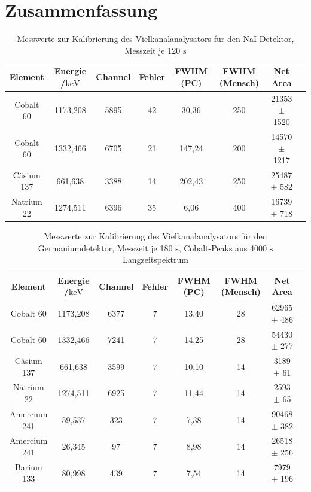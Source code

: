 \documentclass[
	parskip=half,10pt,
	numbers= noenddot, %
	toc=flat, %
	oneside,
	twocolumn,
	]{scrartcl}
\begin{document}
\section{Zusammenfassung}

\newpage



\FloatBarrier
\begin{appendix}

\begin{table}[h]
 \begin{tabular}{cccccccc}
Element & Energie /$\si{\kilo \electronvolt}$& Channel & Fehler & FWHM (PC) & FWHM (Mensch) & Net Area \\
\hline
Cobalt 60  & 1173,208 & 5895 & 42 & 30,36 & 250 & 21353 $\pm$ 1520 \\
Cobalt 60  & 1332,466 & 6705 & 21 & 147,24 & 200 & 14570 $\pm$ 1217 \\
Cäsium 137 &  661,638 & 3388 & 14 & 202,43 & 250 & 25487 $\pm$ 582 \\
Natrium 22 & 1274,511 & 6396 & 35 & 6,06 & 400 & 16739 $\pm$ 718 \\
 \end{tabular}
\caption{Messwerte zur Kalibrierung des Vielkanalanalysators für den NaI-Detektor, Messzeit je 120 $\si{\second}$}
\label{tab:kalib_NaI}
\end{table}

\begin{table}[h]
 \begin{tabular}{cccccccc}
Element & Energie /$\si{\kilo \electronvolt}$& Channel & Fehler & FWHM (PC) & FWHM (Mensch) & Net Area \\
\hline
Cobalt 60    & 1173,208 & 6377 & 7 & 13,40 & 28 & 62965 $\pm$ 486 \\
Cobalt 60    & 1332,466 & 7241 & 7 & 14,25 & 28 & 54430 $\pm$ 277 \\
Cäsium 137   &  661,638 & 3599 & 7 & 10,10 & 14 &  3189 $\pm$  61 \\
Natrium 22   & 1274,511 & 6925 & 7 & 11,44 & 14 &  2593 $\pm$  65 \\
Amercium 241 &   59,537 &  323 & 7 &  7,38 & 14 & 90468 $\pm$ 382 \\
Amercium 241 &   26,345 &   97 & 7 &  8,98 & 14 & 26518 $\pm$ 256 \\
Barium 133   &   80,998 &  439 & 7 &  7,54 & 14 &  7979 $\pm$ 196
\end{tabular}
\caption{Messwerte zur Kalibrierung des Vielkanalanalysators für den Germaniumdetektor, Messzeit je 180 $\si{\second}$, Cobalt-Peaks aus 4000 $\si{\second}$ 
Langzeitspektrum}
\label{tab:Kalib_Ge}
\end{table}



\end{appendix}
\end{document}
